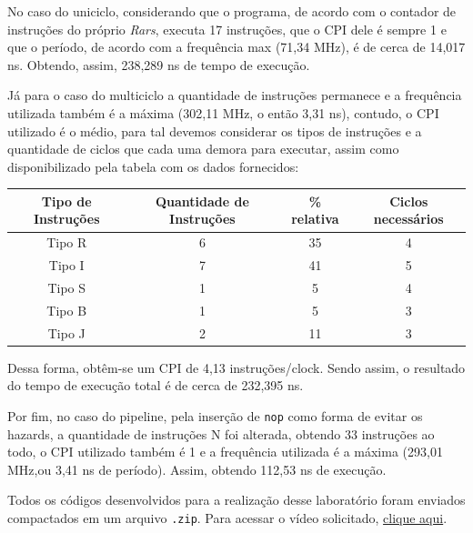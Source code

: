\documentclass[a4paper,12pt]{article}
\newcommand{\cod}[1]{\texttt{#1}}
\begin{document}
No caso do uniciclo, considerando que o programa, de acordo com o contador de instruções do próprio \textit{Rars}, executa 17 instruções, que o CPI dele é sempre 1 e que o período, de acordo com a frequência max (71,34 MHz), é de cerca de 14,017 ns. Obtendo, assim, 238,289 ns de tempo de execução.

Já para o caso do multiciclo a quantidade de instruções permanece e a frequência utilizada também é a máxima (302,11 MHz, o então 3,31 ns), contudo, o CPI utilizado é o médio, para tal devemos considerar os tipos de instruções e a quantidade de ciclos que cada uma demora para executar, assim como disponibilizado pela tabela com os dados fornecidos:

\begin{table}[H]
    \centering
\begin{tabular}{c|c|c|c}
Tipo de Instruções & Quantidade de Instruções & \% relativa & Ciclos necessários \\ \hline
Tipo R             & 6                        & 35          & 4                  \\
Tipo I             & 7                        & 41          & 5                  \\
Tipo S             & 1                        & 5           & 4                  \\
Tipo B             & 1                        & 5           & 3                  \\
Tipo J             & 2                        & 11          & 3                  
\end{tabular}
\end{table}

Dessa forma, obtêm-se um CPI de 4,13 instruções/clock. Sendo assim, o resultado do tempo de execução total é de cerca de 232,395 ns.

Por fim, no caso do pipeline, pela inserção de \cod{nop} como forma de evitar os hazards, a quantidade de instruções N foi alterada, obtendo 33 instruções ao todo, o CPI utilizado também é 1 e a frequência utilizada é a máxima (293,01 MHz,ou 3,41 ns de período). Assim, obtendo 112,53 ns de execução.


Todos os códigos desenvolvidos para a realização desse laboratório foram enviados compactados em um arquivo \cod{.zip}. Para acessar o vídeo solicitado, \href{https://www.youtube.com/watch?v=x1JfjiayK7M}{clique aqui}.
\end{document}
